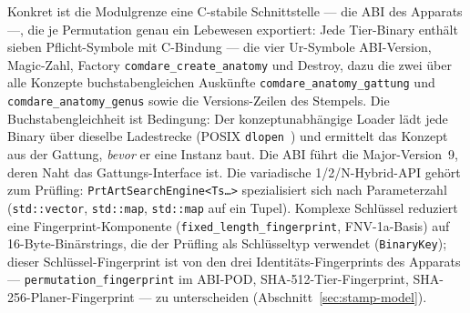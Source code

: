 \begin{nurkurz}
Konkret ist die Modulgrenze eine C-stabile Schnittstelle --- die ABI des Apparats ---, die je Permutation
genau ein Lebewesen exportiert: Jede Tier-Binary enthält sieben Pflicht-Symbole mit C-Bindung --- die vier
Ur-Symbole ABI-Version, Magic-Zahl, Factory \texttt{comdare\_\allowbreak{}create\_\allowbreak{}anatomy} und
Destroy, dazu die zwei über alle Konzepte buchstabengleichen Auskünfte
\texttt{comdare\_\allowbreak{}anatomy\_\allowbreak{}gattung} und
\texttt{comdare\_\allowbreak{}anatomy\_\allowbreak{}genus} sowie die Versions-Zeilen des Stempels. Die
Buchstabengleichheit ist Bedingung: Der konzeptunabhängige Loader lädt jede Binary über dieselbe
Ladestrecke (POSIX \texttt{dlopen}~\cite{posix_dlopen}) und ermittelt das Konzept aus der Gattung,
\emph{bevor} er eine Instanz baut. Die ABI führt die Major-Version~9, deren Naht das Gattungs-Interface ist.
Die variadische 1/2/N-Hybrid-API gehört zum Prüfling: \texttt{PrtArtSearchEngine<Ts\ldots>} spezialisiert
sich nach Parameterzahl (\texttt{std::vector}, \texttt{std::map}, \texttt{std::map} auf ein Tupel). Komplexe
Schlüssel reduziert eine Fingerprint-Komponente
(\texttt{fixed\_\allowbreak{}length\_\allowbreak{}fingerprint}, FNV-1a-Basis) auf 16-Byte-Binärstrings,
die der Prüfling als Schlüsseltyp verwendet (\texttt{BinaryKey}); dieser Schlüssel-Fingerprint ist von den
drei Identitäts-Fingerprints des Apparats --- \texttt{permutation\_\allowbreak{}fingerprint} im ABI-POD,
SHA-512-Tier-Fingerprint, SHA-256-Planer-Fingerprint --- zu unterscheiden (Abschnitt~\ref{sec:stamp-model}).
\end{nurkurz}

